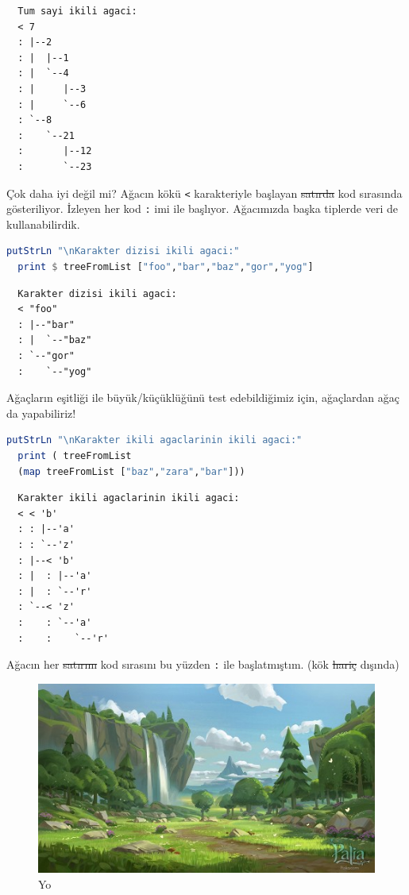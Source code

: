 \documentclass[a4paper,14pt,openany]{extbook} %
\begin{document}
\begin{lstlisting}
  Tum sayi ikili agaci:
  < 7
  : |--2
  : |  |--1
  : |  `--4
  : |     |--3
  : |     `--6
  : `--8
  :    `--21
  :       |--12
  :       `--23
\end{lstlisting}

Çok daha iyi değil mi? Ağacın kökü \lstinline!<! karakteriyle başlayan
\st{satırda} kod sırasında gösteriliyor. İzleyen her kod \lstinline!:! imi ile
başlıyor. Ağacımızda başka tiplerde veri de kullanabilirdik.

\begin{lstlisting}[language=Haskell]
  putStrLn "\nKarakter dizisi ikili agaci:"
  print $ treeFromList ["foo","bar","baz","gor","yog"]
\end{lstlisting}

\begin{lstlisting}
  Karakter dizisi ikili agaci:
  < "foo"
  : |--"bar"
  : |  `--"baz"
  : `--"gor"
  :    `--"yog"
\end{lstlisting}

Ağaçların eşitliği ile büyük/küçüklüğünü test edebildiğimiz için,
ağaçlardan ağaç da yapabiliriz!

\begin{lstlisting}[language=Haskell]
  putStrLn "\nKarakter ikili agaclarinin ikili agaci:"
  print ( treeFromList
  (map treeFromList ["baz","zara","bar"]))
\end{lstlisting}

\begin{lstlisting}
  Karakter ikili agaclarinin ikili agaci:
  < < 'b'
  : : |--'a'
  : : `--'z'
  : |--< 'b'
  : |  : |--'a'
  : |  : `--'r'
  : `--< 'z'
  :    : `--'a'
  :    :    `--'r'
\end{lstlisting}

Ağacın her \st{satırını} kod sırasını bu yüzden \lstinline!:! ile başlatmıştım.
(kök \st{hariç} dışında)

\begin{figure}[htbp]
  \centering
  \includegraphics{img/yo_dawg_tree.jpg}
  \caption{Yo}
\end{figure}
\end{document}

